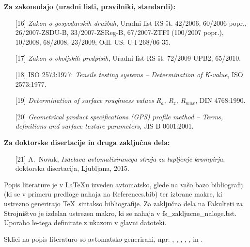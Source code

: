 \textbf{Za zakonodajo (uradni listi, pravilniki, standardi):}
\begin{itemize}
	\item[{[16]}] \emph{Zakon o gospodarskih družbah}, {U}radni list RS št. 
	42/2006, 60/2006 popr., 26/2007-ZSDU-B, 33/2007-ZSReg-B, 67/2007-ZTFI 
	(100/2007 
	popr.), 10/2008, 68/2008, 23/2009; Odl. US: U-I-268/06-35.\\
	
	\item[{[17]}] \emph{Zakon o okoljskih predpisih}, {U}radni list RS št. 
	72/2009-UPB2, 65/2010.\\
	
	\item[{[18]}] {ISO 2573:1977}: \emph{Tensile testing systems – 
	Determination of 
		K-value}, {ISO 2573:1977}.\\
	
	\item[{[19]}] \emph{Determination of surface roughness values R$_a$, R$_z$, 
		R$_{max}$}, {DIN 4768:1990}.\\
	
	\item[{[20]}] \emph{Geometrical product specifications (GPS) profile method 
	– 
		Terms, definitions and surface texture parameters}, {JIS B 0601:2001}.
\end{itemize}

\textbf{Za doktorske disertacije in druga zaključna dela:}
\begin{itemize}
	\item[{[21]}] A.~Novak, \emph{Izdelava avtomatiziranega stroja za lupljenje 
		krompirja}, doktorska disertacija, Ljubljana, 2015.
\end{itemize}

Popis literature je v \LaTeX u izveden avtomatsko, glede na vašo bazo 
bibliografij (ki se v primeru predloge nahaja na References.bib) ter izbrane 
makre, ki ustrezno generirajo \TeX~sintakso bibliografije. Za zaključna dela na 
Fakulteti za Strojništvo je izdelan ustrezen makro, ki se nahaja v 
fs\_zakljucne\_naloge.bst. Uporabo le-tega definirate z ukazom 
\verb|| v glavni datoteki.

Sklici na popis literaturo so avtomatsko generirani, npr: \cite{bazant_1991}, 
\cite{Doe_1991},  \cite{Bazant_2008}, \cite{Gonzalez_2014, Bazant_2005} 
\cite{Bazant_2007, Kogoj_DTD, Merkur_2005, SURS_2009, SURS_2005, MKariera, 
	Encyclopedia, Posl_app, ZGD, ZOP}, \cite{ISO_2573}, \cite{DIN_4768} in 
\cite{JISB0601, Novak_2015}.
